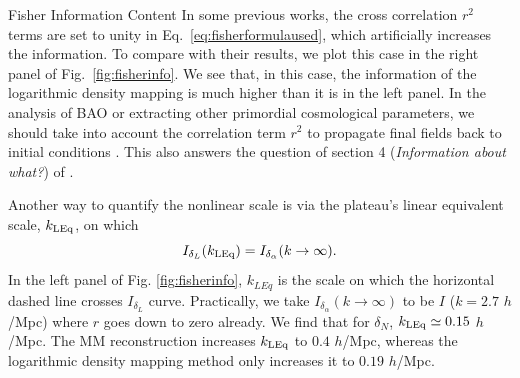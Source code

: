 \begin{section}{Fisher Information Content}
  In some previous works, the cross correlation $r^2$ terms are set
  to unity in Eq.~\ref{eq:fisherformulaused}, which artificially
  increases the information. To compare with their results, we plot this case in the right panel of 
  Fig.~\ref{fig:fisherinfo}.  We see that, in this case, the information of the logarithmic density
  mapping is much higher than it is in the left panel.
  In the analysis of BAO or extracting other primordial cosmological
  parameters, we should take into account the correlation term $r^2$
  to propagate final fields back to initial conditions \citep{bib:HarnoisD2013}.
  This also answers the question of section 4
  ({\it Information about what?}) of \citet{bib:HarnoisD2013}.

  Another way to quantify the nonlinear scale is via the plateau's linear equivalent scale, $k_{\rm LEq}$, on which 
  \begin{equation}
      I_{\delta_L}(k_{\rm LEq})=I_{\delta_{\alpha}}(k\rightarrow\infty).
  \end{equation}
  In the left panel of Fig. \ref{fig:fisherinfo}, $k_{LEq}$ is the scale on which 
  the horizontal dashed line crosses $I_{\delta_{L}}$ curve.
  Practically, we take $I_{\delta_{\alpha}}(k\rightarrow\infty)$ to be
  $I$ ($k=2.7$ $h$/Mpc) where $r$ goes down to zero already.  We find that
  for $\delta_N$, $k_{\rm LEq}\simeq 0.15$ $h$/Mpc.
  The MM reconstruction increases $k_{\rm LEq}$ to $0.4$ $h$/Mpc,
  whereas the logarithmic density mapping method only increases it to $0.19$ $h$/Mpc.


\end{section}
